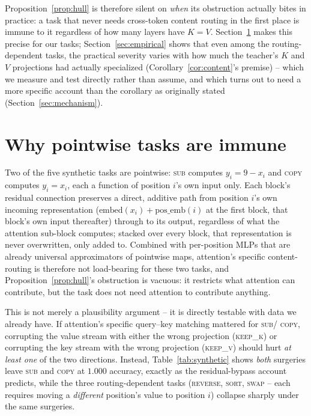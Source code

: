 \documentclass[11pt]{article}
\begin{document}
Proposition~\ref{prop:hull} is therefore silent on \emph{when} its obstruction
actually bites in practice: a task that never needs cross-token content routing in
the first place is immune to it regardless of how many layers have $K=V$.
Section~\ref{sec:pointwise} makes this precise for our tasks; Section~\ref{sec:empirical}
shows that even among the routing-dependent tasks, the practical severity varies with
how much the teacher's $K$ and $V$ projections had actually specialized
(Corollary~\ref{cor:content}'s premise) -- which we measure and test directly rather
than assume, and which turns out to need a more specific account than the corollary as
originally stated (Section~\ref{sec:mechanism}).

\section{Why pointwise tasks are immune}
\label{sec:pointwise}

Two of the five synthetic tasks are pointwise: \textsc{sub} computes $y_i = 9 - x_i$
and \textsc{copy} computes $y_i = x_i$, each a function of position $i$'s own input
only. Each block's residual connection preserves a direct, additive path from
position $i$'s own incoming representation ($\text{embed}(x_i) + \text{pos\_emb}(i)$
at the first block, that block's own input thereafter) through to its output,
regardless of what the attention sub-block computes; stacked over every block, that
representation is never overwritten, only added to. Combined with per-position MLPs
that are already universal approximators of pointwise maps, attention's specific
content-routing is therefore not load-bearing for these two tasks, and
Proposition~\ref{prop:hull}'s obstruction is vacuous: it restricts what attention can
contribute, but the task does not need attention to contribute anything.

This is not merely a plausibility argument -- it is directly testable with data we
already have. If attention's specific query--key matching mattered for \textsc{sub}/
\textsc{copy}, corrupting the value stream with either the wrong projection
(\textsc{keep\_k}) or corrupting the key stream with the wrong projection
(\textsc{keep\_v}) should hurt \emph{at least one} of the two directions. Instead,
Table~\ref{tab:synthetic} shows \emph{both} surgeries leave \textsc{sub} and
\textsc{copy} at $1.000$ accuracy, exactly as the residual-bypass account predicts,
while the three routing-dependent tasks (\textsc{reverse}, \textsc{sort},
\textsc{swap} -- each requires moving a \emph{different} position's value to position
$i$) collapse sharply under the same surgeries.
\end{document}
